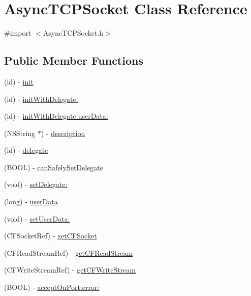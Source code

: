 \hypertarget{interface_async_t_c_p_socket}{
\section{AsyncTCPSocket Class Reference}
\label{interface_async_t_c_p_socket}
}


{\ttfamily \#import $<$AsyncTCPSocket.h$>$}

\subsection*{Public Member Functions}
\begin{DoxyCompactItemize}
\item 
(id) -\/ \hyperlink{interface_async_t_c_p_socket_a4213bb26f5207ee3f402fe463badc691}{init}
\item 
(id) -\/ \hyperlink{interface_async_t_c_p_socket_a918ea9d2f36714a76a7f19a5213a0473}{initWithDelegate:}
\item 
(id) -\/ \hyperlink{interface_async_t_c_p_socket_a65ebd73324c0920a291449a38e2ff3ff}{initWithDelegate:userData:}
\item 
(NSString $\ast$) -\/ \hyperlink{interface_async_t_c_p_socket_a0920dc7935061bc57daab91706be5934}{description}
\item 
(id) -\/ \hyperlink{interface_async_t_c_p_socket_a6c98e239b6ba279cfc95c64db9de555c}{delegate}
\item 
(BOOL) -\/ \hyperlink{interface_async_t_c_p_socket_a168882e4d28c43d2c91f85971970afa1}{canSafelySetDelegate}
\item 
(void) -\/ \hyperlink{interface_async_t_c_p_socket_a5147f10c2f5e0df2682c4ce073138ac8}{setDelegate:}
\item 
(long) -\/ \hyperlink{interface_async_t_c_p_socket_ad5ec7ee01c3a572cf338782460044b21}{userData}
\item 
(void) -\/ \hyperlink{interface_async_t_c_p_socket_a3e2af6a69a1c75cb9b228c871ade8419}{setUserData:}
\item 
(CFSocketRef) -\/ \hyperlink{interface_async_t_c_p_socket_a717e5a3ee700cbde4df757cf8cdb407e}{getCFSocket}
\item 
(CFReadStreamRef) -\/ \hyperlink{interface_async_t_c_p_socket_ab32fc38e33a984e159df0a522e26a6a8}{getCFReadStream}
\item 
(CFWriteStreamRef) -\/ \hyperlink{interface_async_t_c_p_socket_a5651f189d6f4540c324e52bc27ecad89}{getCFWriteStream}
\item 
(BOOL) -\/ \hyperlink{interface_async_t_c_p_socket_ac015445dd1feaaa3b0a07ef63b4d806f}{acceptOnPort:error:}

\end{DoxyCompactItemize}

